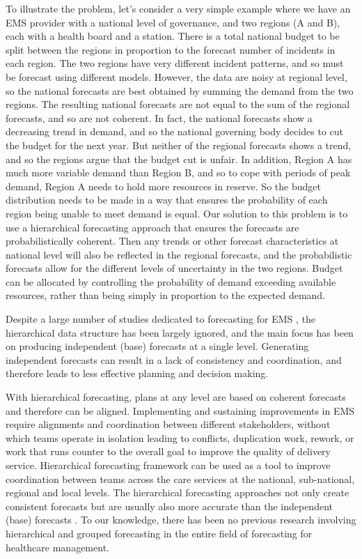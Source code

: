 \documentclass[
  authoryear,
  preprint,
  3p]{elsarticle}
\begin{document}
To illustrate the problem, let's consider a very simple example where we
have an EMS provider with a national level of governance, and two
regions (A and B), each with a health board and a station. There is a
total national budget to be split between the regions in proportion to
the forecast number of incidents in each region. The two regions have
very different incident patterns, and so must be forecast using
different models. However, the data are noisy at regional level, so the
national forecasts are best obtained by summing the demand from the two
regions. The resulting national forecasts are not equal to the sum of
the regional forecasts, and so are not coherent. In fact, the national
forecasts show a decreasing trend in demand, and so the national
governing body decides to cut the budget for the next year. But neither
of the regional forecasts shows a trend, and so the regions argue that
the budget cut is unfair. In addition, Region A has much more variable
demand than Region B, and so to cope with periods of peak demand, Region
A needs to hold more resources in reserve. So the budget distribution
needs to be made in a way that ensures the probability of each region
being unable to meet demand is equal. Our solution to this problem is to
use a hierarchical forecasting approach that ensures the forecasts are
probabilistically coherent. Then any trends or other forecast
characteristics at national level will also be reflected in the regional
forecasts, and the probabilistic forecasts allow for the different
levels of uncertainty in the two regions. Budget can be allocated by
controlling the probability of demand exceeding available resources,
rather than being simply in proportion to the expected demand.

Despite a large number of studies dedicated to forecasting for EMS
\citep{mingliterature2022, gul2020exhaustive, ibrahim2016modeling, wargon2009systematic},
the hierarchical data structure has been largely ignored, and the main
focus has been on producing independent (base) forecasts at a single
level. Generating independent forecasts can result in a lack of
consistency and coordination, and therefore leads to less effective
planning and decision making.

With hierarchical forecasting, plans at any level are based on coherent
forecasts and therefore can be aligned. Implementing and sustaining
improvements in EMS require alignments and coordination between
different stakeholders, without which teams operate in isolation leading
to conflicts, duplication work, rework, or work that runs counter to the
overall goal to improve the quality of delivery service. Hierarchical
forecasting framework can be used as a tool to improve coordination
between teams across the care services at the national, sub-national,
regional and local levels. The hierarchical forecasting approaches not
only create consistent forecasts but are usually also more accurate than
the independent (base) forecasts \citep{hyndman2011optimal}. To our
knowledge, there has been no previous research involving hierarchical
and grouped forecasting in the entire field of forecasting for
healthcare management.
\end{document}
